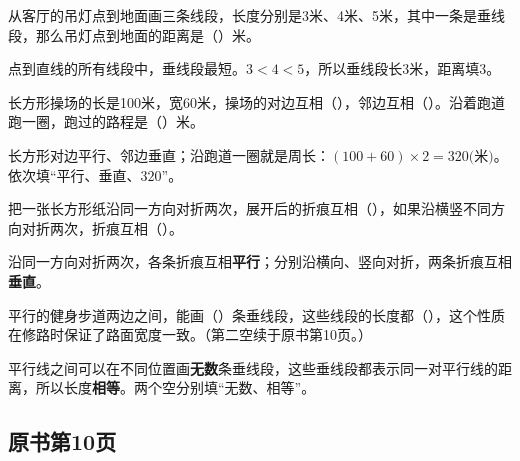 从客厅的吊灯点到地面画三条线段，长度分别是3米、4米、5米，其中一条是垂线段，那么吊灯点到地面的距离是（\hspace{1.8em}）米。\par
\begin{BookAnswer}
点到直线的所有线段中，垂线段最短。\(3<4<5\)，所以垂线段长\(3\)米，距离填\(3\)。
\end{BookAnswer}

长方形操场的长是100米，宽60米，操场的对边互相（\hspace{1.8em}），邻边互相（\hspace{1.8em}）。沿着跑道跑一圈，跑过的路程是（\hspace{1.8em}）米。\par
\begin{BookAnswer}
长方形对边平行、邻边垂直；沿跑道一圈就是周长：\((100+60)\times2=320\text{(米)}\)。依次填“平行、垂直、\(320\)”。
\end{BookAnswer}

把一张长方形纸沿同一方向对折两次，展开后的折痕互相（\hspace{1.8em}），如果沿横竖不同方向对折两次，折痕互相（\hspace{1.8em}）。\par
\begin{BookAnswer}
沿同一方向对折两次，各条折痕互相\textbf{平行}；分别沿横向、竖向对折，两条折痕互相\textbf{垂直}。
\end{BookAnswer}

平行的健身步道两边之间，能画（\hspace{1.8em}）条垂线段，这些线段的长度都（\hspace{1.8em}），这个性质在修路时保证了路面宽度一致。（第二空续于原书第10页。）\par
\begin{BookAnswer}
平行线之间可以在不同位置画\textbf{无数}条垂线段，这些垂线段都表示同一对平行线的距离，所以长度\textbf{相等}。两个空分别填“无数、相等”。
\end{BookAnswer}



\subsection*{原书第10页}

